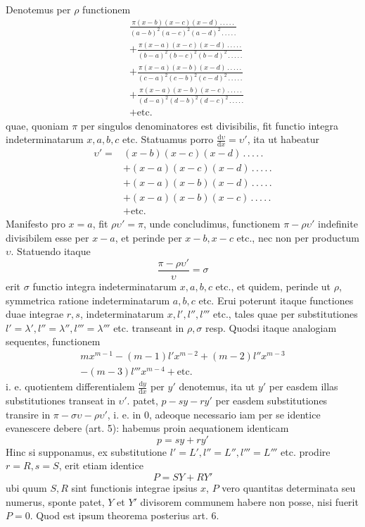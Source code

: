 Denotemus per $\rho$ functionem
\[
\begin{aligned}
&\frac{\pi(x-b)(x-c)(x-d)\, .\, .\, .\, .\, .}{(a-b)^2(a-c)^2(a-d)^2\, .\, .\, .\, .\, .}\\
&+\frac{\pi(x-a)(x-c)(x-d)\, .\, .\, .\, .\, .}{(b-a)^2(b-c)^2(b-d)^2\, .\, .\, .\, .\, .}\\
&+\frac{\pi(x-a)(x-b)(x-d)\, .\, .\, .\, .\, .}{(c-a)^2(c-b)^2(c-d)^2\, .\, .\, .\, .\, .}\\
&+\frac{\pi(x-a)(x-b)(x-c)\, .\, .\, .\, .\, .}{(d-a)^2(d-b)^2(d-c)^2\, .\, .\, .\, .\, .}\\
&+\text{etc.}
\end{aligned}
\]
quae, quoniam $\pi$ per singulos denominatores est divisibilis, fit functio integra
indeterminatarum $x,a,b,c$ etc. Statuamus porro $\frac{\mathrm d\upsilon}{\mathrm dx}=\upsilon'$, ita ut habeatur
\[
\begin{aligned}
\upsilon'={}&(x-b)(x-c)(x-d)\, .\, .\, .\, .\, .\\
&+(x-a)(x-c)(x-d)\, .\, .\, .\, .\, .\\
&+(x-a)(x-b)(x-d)\, .\, .\, .\, .\, .\\
&+(x-a)(x-b)(x-c)\, .\, .\, .\, .\, .\\
&+\text{etc.}
\end{aligned}
\]
Manifesto pro $x=a$, fit $\rho\upsilon'=\pi$, unde concludimus, functionem $\pi-\rho\upsilon'$ indefinite divisibilem esse per $x-a$, et perinde per $x-b,x-c$ etc., nec non
per productum $\upsilon$. Statuendo itaque
\[
\frac{\pi-\rho\upsilon'}{\upsilon}=\sigma
\]
erit $\sigma$ functio integra indeterminatarum $x,a,b,c$ etc., et quidem, perinde ut $\rho$,
symmetrica ratione indeterminatarum $a,b,c$ etc. Erui poterunt itaque functiones duae integrae $r,s$, indeterminatarum $x,l',l'',l'''$ etc., tales quae per substitutiones $l'=\lambda',l''=\lambda'',l'''=\lambda'''$ etc. transeant in $\rho,\sigma$ resp. Quodsi itaque analogiam sequentes, functionem
\[
\begin{gathered}mx^{m-1}-(m-1)l'x^{m-2}+(m-2)l''x^{m-3}\\-(m-3)l'''x^{m-4}+\text{etc.}\end{gathered}
\]
i. e. quotientem differentialem $\frac{\mathrm dy}{\mathrm dx}$ per $y'$ denotemus, ita ut $y'$ per easdem illas
substitutiones transeat in $\upsilon'$. patet, $p-sy-ry'$ per easdem substitutiones transire
in $\pi-\sigma\upsilon-\rho\upsilon'$, i. e. in 0, adeoque necessario iam per se identice evanescere
debere (art. 5): habemus proin aequationem identicam
\[
p=sy+ry'
\]
Hinc si supponamus, ex substitutione $l'=L',l''=L'',l'''=L'''$ etc. prodire
$r=R,s=S$, erit etiam identice
\[
P=SY+RY'
\]
ubi quum $S,R$ sint functionis integrae ipsius $x$, $P$ vero quantitas determinata
seu numerus, sponte patet, $Y$ et $Y'$ divisorem communem habere non posse, nisi
fuerit $P=0$. Quod est ipsum theorema posterius art. 6.

